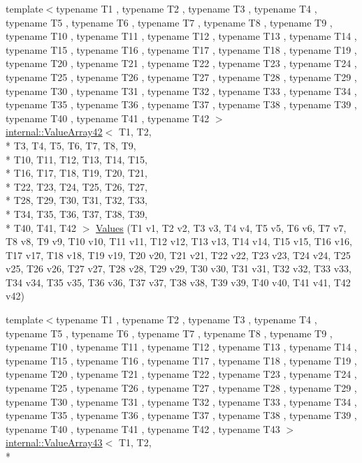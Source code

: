 \begin{DoxyCompactItemize}
\item 
{\footnotesize template$<$typename T1 , typename T2 , typename T3 , typename T4 , typename T5 , typename T6 , typename T7 , typename T8 , typename T9 , typename T10 , typename T11 , typename T12 , typename T13 , typename T14 , typename T15 , typename T16 , typename T17 , typename T18 , typename T19 , typename T20 , typename T21 , typename T22 , typename T23 , typename T24 , typename T25 , typename T26 , typename T27 , typename T28 , typename T29 , typename T30 , typename T31 , typename T32 , typename T33 , typename T34 , typename T35 , typename T36 , typename T37 , typename T38 , typename T39 , typename T40 , typename T41 , typename T42 $>$ }\\\hyperlink{classtesting_1_1internal_1_1ValueArray42}{internal\-::\-Value\-Array42}$<$ T1, T2, \\*
T3, T4, T5, T6, T7, T8, T9, \\*
T10, T11, T12, T13, T14, T15, \\*
T16, T17, T18, T19, T20, T21, \\*
T22, T23, T24, T25, T26, T27, \\*
T28, T29, T30, T31, T32, T33, \\*
T34, T35, T36, T37, T38, T39, \\*
T40, T41, T42 $>$ \hyperlink{namespacetesting_a0951fc3989cde27914791eb120f8f01c}{Values} (T1 v1, T2 v2, T3 v3, T4 v4, T5 v5, T6 v6, T7 v7, T8 v8, T9 v9, T10 v10, T11 v11, T12 v12, T13 v13, T14 v14, T15 v15, T16 v16, T17 v17, T18 v18, T19 v19, T20 v20, T21 v21, T22 v22, T23 v23, T24 v24, T25 v25, T26 v26, T27 v27, T28 v28, T29 v29, T30 v30, T31 v31, T32 v32, T33 v33, T34 v34, T35 v35, T36 v36, T37 v37, T38 v38, T39 v39, T40 v40, T41 v41, T42 v42)
\item 
{\footnotesize template$<$typename T1 , typename T2 , typename T3 , typename T4 , typename T5 , typename T6 , typename T7 , typename T8 , typename T9 , typename T10 , typename T11 , typename T12 , typename T13 , typename T14 , typename T15 , typename T16 , typename T17 , typename T18 , typename T19 , typename T20 , typename T21 , typename T22 , typename T23 , typename T24 , typename T25 , typename T26 , typename T27 , typename T28 , typename T29 , typename T30 , typename T31 , typename T32 , typename T33 , typename T34 , typename T35 , typename T36 , typename T37 , typename T38 , typename T39 , typename T40 , typename T41 , typename T42 , typename T43 $>$ }\\\hyperlink{classtesting_1_1internal_1_1ValueArray43}{internal\-::\-Value\-Array43}$<$ T1, T2, \\*

\end{DoxyCompactItemize}
